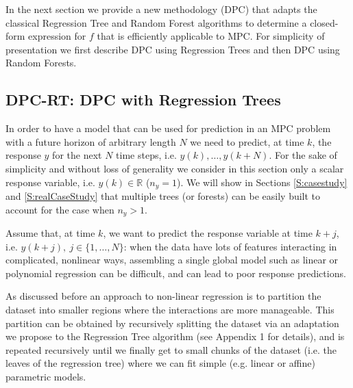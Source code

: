 \textcolor[rgb]{0,0,1}{In the next section we provide a new methodology (DPC) that adapts the classical Regression Tree and Random Forest algorithms to determine a closed-form expression for $f$ that is efficiently applicable to MPC. For simplicity of presentation we first describe DPC using Regression Trees and then DPC using Random Forests.}





\subsection{DPC-RT: DPC with Regression Trees}

\label{SS:dpcrt}

\textcolor[rgb]{0,0,1}{In order to have a model that can be used for prediction in an MPC problem with a future horizon of arbitrary length $N$	 we need to predict, at time $k$, the response $y$ for the next $N$ time steps, i.e. $y(k),\ldots,y(k+N)$. For the sake of simplicity and without loss of generality we consider in this section only a scalar response variable, i.e. $y(k)\in\mathbb{R}$ ($n_y = 1$). We will show in Sections \ref{S:casestudy} and \ref{S:realCaseStudy} that multiple trees (or forests) can be easily built to account for the case when $n_y > 1$.}

\textcolor[rgb]{0,0,1}{Assume that, at time $k$, we want to predict the response variable at time $k+j$, i.e. $y(k+j),\ j\in \{1,\ldots,N\}$: when the data have lots of features interacting in complicated, nonlinear ways, assembling a single global model such as linear or polynomial regression can be difficult, and can lead to poor response predictions.}

\textcolor[rgb]{0,0,1}{As discussed before an approach to non-linear regression is to partition the dataset into smaller regions where the interactions are more manageable. This partition can be obtained by recursively splitting the dataset via an adaptation we propose to the Regression Tree algorithm (see Appendix 1 for details), and is repeated recursively until we finally get to small chunks of the dataset (i.e. the leaves of the regression tree) where we can fit simple (e.g. linear or affine) parametric models.}


